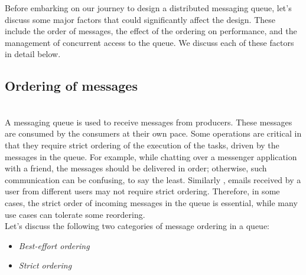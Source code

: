 

Before embarking on our journey to design a distributed messaging queue, let's discuss some major factors that could significantly affect the design. These include the order of messages, the effect of the ordering on performance, and the management of concurrent access to the queue. We discuss each of these factors in detail below.

\subsection{Ordering of messages}\label{PMBDA01ByIIJuGPagf651}
\\
A messaging queue is used to receive messages from producers. These messages are consumed by the consumers at their own pace. Some operations are critical in that they require strict ordering of the execution of the tasks, driven by the messages in the queue. For example, while chatting over a messenger application with a friend, the messages should be delivered in order; otherwise, such communication can be confusing, to say the least. Similarly , emails received by a user from different users may not require strict ordering. Therefore, in some cases, the strict order of incoming messages in the queue is essential, while many use cases can tolerate some reordering.
\\
Let's discuss the following two categories of message ordering in a queue:

\begin{itemize}
\item
\protect{}\label{kRovk16FApPPQ2LJ-Rnn-}
\emph{Best-effort ordering}
\item
\protect{}\label{1iIDGIDr9r1q4PikQQ-Xm}
\emph{Strict ordering}
\end{itemize}


